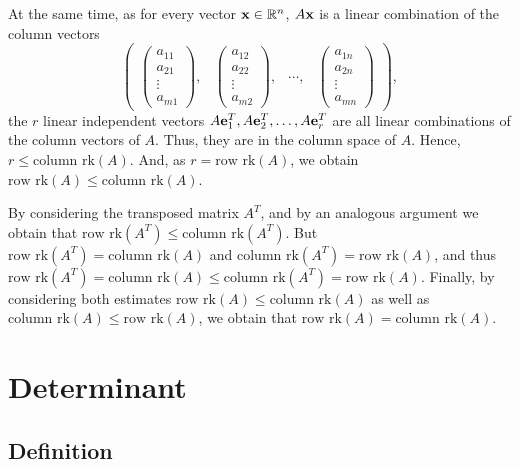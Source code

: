 {At the same time,
as
for every vector ${\bf x}\in {\Bbb R}^n$,
$A{\bf x}$ is a linear combination of the column vectors
$$
\begin{pmatrix}
\begin{pmatrix}
a_{11}\\
a_{21}\\
\vdots \\
a_{m1}
\end{pmatrix},
&
\begin{pmatrix}
a_{12}\\
a_{22}\\
\vdots \\
a_{m2}
\end{pmatrix},
&
\cdots  ,
&
\begin{pmatrix}
a_{1n}\\
a_{2n}\\
\vdots \\
a_{mn}
\end{pmatrix}
\end{pmatrix}
,
$$
the $r$ linear independent vectors
$A{\bf e}_1^T,A{\bf e}_2^T, \ldots ,A{\bf e}_r^T$
are all linear combinations of the column vectors of $A$.
Thus, they are in the column space of $A$.
Hence, $r\le \textrm{column rk}(A)$.
And, as $r= \textrm{row rk}(A)$,
we obtain
$ \textrm{row rk}(A)\le \textrm{column rk}(A)$.

By considering the transposed matrix $A^T$, and by an analogous argument   we obtain
that
$ \textrm{row rk}(A^T)\le \textrm{column rk}(A^T)$.
But
$ \textrm{row rk}(A^T)= \textrm{column rk}(A)$
and
$ \textrm{column rk}(A^T)= \textrm{row rk}(A)$,
and thus
$ \textrm{row rk}(A^T)= \textrm{column rk}(A)\le \textrm{column rk}(A^T)= \textrm{row rk}(A)$.
Finally, by considering both estimates
$ \textrm{row rk}(A)\le \textrm{column rk}(A)$
as well as
$\textrm{column rk}(A)\le \textrm{row rk}(A)$,
we obtain that
$ \textrm{row rk}(A) = \textrm{column rk}(A)$.
\eproof
}

\section{Determinant}

\subsection{Definition}

